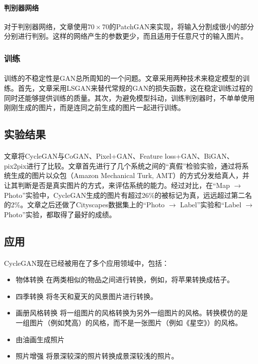 \documentclass[12pt,a4paper]{article}
\begin{document}
	\paragraph{判别器网络} 对于判别器网络，文章使用$70 \times 70$的PatchGAN来实现，将输入分割成很小的部分分别进行判别。这样的网络产生的参数更少，而且适用于任意尺寸的输入图片。
	
	\subsubsection{训练}
	\paragraph{} 训练的不稳定性是GAN总所周知的一个问题。文章采用两种技术来稳定模型的训练。首先，文章采用LSGAN来替代常规的GAN的损失函数，这在稳定训练过程的同时还能够提供训练的质量。其次，为避免模型抖动，训练判别器时，不单单使用刚刚生成的图片，而是连同之前生成的图片一起进行训练。
	
\subsection{实验结果}
\paragraph{} 文章将CycleGAN与CoGAN、Pixel+GAN、Feature loss+GAN、BiGAN、pix2pix进行了比较。文章首先进行了几个系统之间的“真假”检验实验，通过将系统生成的图片以众包（Amazon Mechanical Turk, AMT）的方式分发给真人，并让其判断是否是真实图片的方式，来评估系统的能力。经过对比，在“Map $\rightarrow$ Photo”实验中，CycleGAN生成的图片有超过26\%的被标记为真，远远超过第二名的2\%。文章之后还做了Cityscapes数据集上的“Photo $\rightarrow$ Label”实验和“Label $\rightarrow$ Photo”实验，都取得了最好的成绩。

\subsection{应用}
\paragraph{} CycleGAN现在已经被用在了多个应用领域中，包括：
\begin{itemize}
	\item{物体转换} 在两类相似的物品之间进行转换，例如，将苹果转换成桔子。
	\item{四季转换} 将冬天和夏天的风景图片进行转换。
	\item{画册风格转换} 将一组图片的风格转换为另外一组图片的风格。转换模仿的是一组图片（例如梵高）的风格，而不是一张图片（例如《星空》）的风格。
	\item{由油画生成照片}
	\item{照片增强} 将景深较深的照片转换成景深较浅的照片。
\end{itemize}
\end{document}
